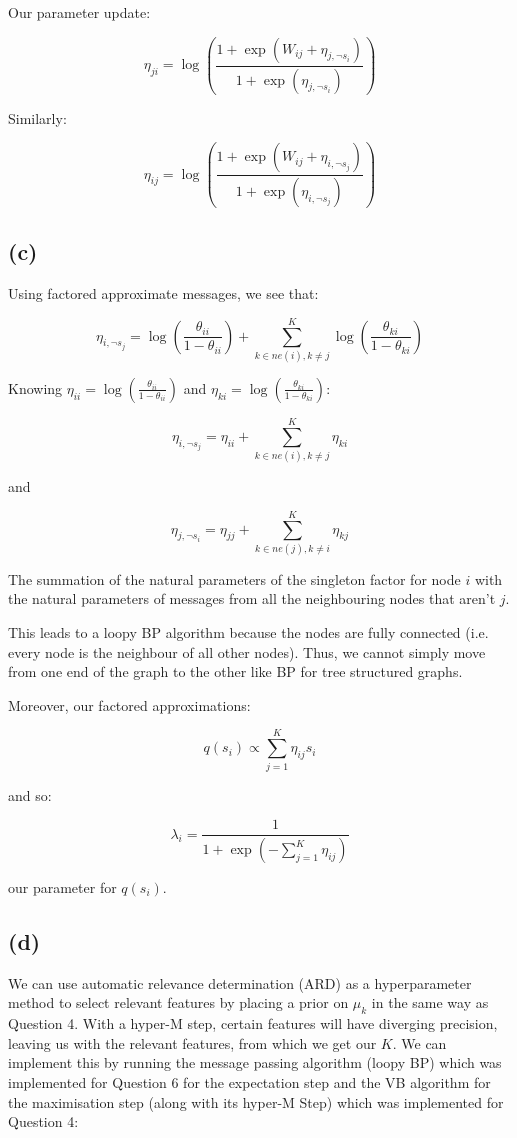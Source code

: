 \documentclass[12pt]{article}
\begin{document}
Our parameter update:

\[\eta_{ji} = \log \left( \frac{1+\exp\left( W_{ij}  + \eta_{j, \neg s_i}\right)}{1+\exp\left( \eta_{j, \neg s_i}\right)} \right)\]

Similarly:

\[\eta_{ij} = \log \left( \frac{1+\exp\left( W_{ij}  + \eta_{i, \neg s_j}\right)}{1+\exp\left( \eta_{i, \neg s_j}\right)} \right)\]


\subsection*{(c)}

Using factored approximate messages, we see that:

\[\eta_{i, \neg s_j} =  \log \left(\frac{\theta_{ii}}{1-\theta_{ii}}\right) + \sum_{k\in ne(i), k\neq j}^{K} \log\left(\frac{\theta_{ki}}{1-\theta_{ki}} \right)\]

Knowing $\eta_{ii}=\log \left(\frac{\theta_{ii}}{1-\theta_{ii}}\right)$ and $\eta_{ki}=\log\left(\frac{\theta_{ki}}{1-\theta_{ki}} \right)$:

\[\eta_{i, \neg s_j} =  \eta_{ii} + \sum_{k\in ne(i), k\neq j}^{K} \eta_{ki}\]

and

\[\eta_{j, \neg s_i} =  \eta_{jj} + \sum_{k\in ne(j), k\neq i}^{K} \eta_{kj}\]


The summation of the natural parameters of the singleton factor for node $i$ with the natural parameters of messages from all the neighbouring nodes that aren't $j$.

This leads to a loopy BP algorithm because the nodes are fully connected (i.e. every node is the neighbour of all other nodes). Thus, we cannot simply move from one end of the graph to the other like BP for tree structured graphs.

Moreover, our factored approximations:

\[q(s_i) \propto \sum_{j=1}^{K} \eta_{ij} s_i\]

and so:

\[\lambda_i = \frac{1}{1+\exp(-\sum_{j=1}^{K} \eta_{ij})}\]

our parameter for $q(s_i)$.


\newpage
\subsection*{(d)}

We can use automatic relevance determination (ARD) as a hyperparameter method to select relevant features by placing a prior on $\mu_k$ in the same way as Question 4. With a hyper-M step, certain features will have diverging precision, leaving us with the relevant features, from which we get our $K$. We can implement this by running the message passing algorithm (loopy BP) which was implemented for Question 6 for the expectation step and the VB algorithm for the maximisation step (along with its hyper-M Step) which was implemented for Question 4:
\end{document}
